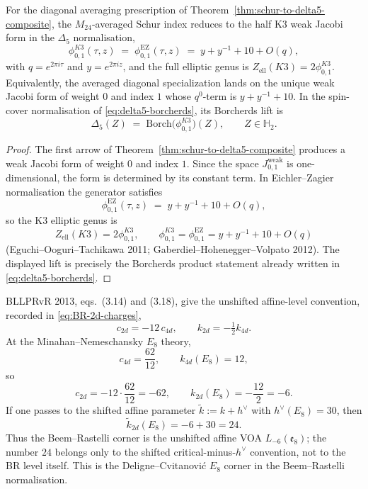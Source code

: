 \begin{proposition}
\label{prop:k3-m24-averaged-reduction}
For the diagonal averaging prescription of
Theorem~\ref{thm:schur-to-delta5-composite}, the $M_{24}$-averaged Schur index
reduces to the half K3 weak Jacobi form in the $\Delta_5$ normalisation,
\[
 \phi_{0,1}^{K3}(\tau,z)
 \;=\;
 \phi_{0,1}^{\mathrm{EZ}}(\tau,z)
 \;=\;
 y+y^{-1}+10+O(q),
\]
with $q=e^{2\pi i\tau}$ and $y=e^{2\pi i z}$, and the full elliptic genus is
$Z_{\mathrm{ell}}(K3)=2\phi_{0,1}^{K3}$. Equivalently, the averaged diagonal
specialization lands on the unique weak Jacobi form of weight $0$ and index
$1$ whose $q^0$-term is $y+y^{-1}+10$. In the spin-cover normalisation of
\eqref{eq:delta5-borcherds}, its Borcherds lift is
\[
 \Delta_5(Z)
 \;=\;
 \mathrm{Borch}\bigl(\phi_{0,1}^{K3}\bigr)(Z),
 \qquad
 Z\in \mathbb{H}_2.
\]
\end{proposition}

\begin{proof}
The first arrow of Theorem~\ref{thm:schur-to-delta5-composite} produces a weak
Jacobi form of weight $0$ and index $1$. Since the space
$J^{\mathrm{weak}}_{0,1}$ is one-dimensional, the form is determined by its
constant term. In Eichler--Zagier normalisation the generator satisfies
\[
 \phi_{0,1}^{\mathrm{EZ}}(\tau,z)
 \;=\;
 y+y^{-1}+10+O(q),
\]
so the K3 elliptic genus is
\[
Z_{\mathrm{ell}}(K3)=2\phi_{0,1}^{K3},\qquad
\phi_{0,1}^{K3}=\phi_{0,1}^{\mathrm{EZ}}
=y+y^{-1}+10+O(q)
\]
(Eguchi--Ooguri--Tachikawa 2011; Gaberdiel--Hohenegger--Volpato 2012). The
displayed lift is precisely the Borcherds product statement already written
in \eqref{eq:delta5-borcherds}.
\end{proof}

\begin{remark}
\label{rem:k3-BR-factor-verify}
BLLPRvR 2013, eqs.~(3.14) and (3.18), give the unshifted affine-level
convention, recorded in \eqref{eq:BR-2d-charges},
\[
 c_{2d} = -12\,c_{4d},
 \qquad
 k_{2d} = -\tfrac{1}{2}k_{4d}.
\]
At the Minahan--Nemeschansky $E_8$ theory,
\[
 c_{4d} = \frac{62}{12},
 \qquad
 k_{4d}(E_8) = 12,
\]
so
\[
 c_{2d} = -12\cdot \frac{62}{12} = -62,
 \qquad
 k_{2d}(E_8) = -\frac{12}{2} = -6.
\]
If one passes to the shifted affine parameter
$\widetilde{k} := k + h^\vee$ with $h^\vee(E_8)=30$, then
\[
 \widetilde{k}_{2d}(E_8) = -6 + 30 = 24.
\]
Thus the Beem--Rastelli corner is the unshifted affine VOA
$L_{-6}(\mathfrak{e}_8)$; the number $24$ belongs only to the shifted
critical-minus-$h^\vee$ convention, not to the BR level itself. This is the
Deligne--Cvitanovi\'c $E_8$ corner in the Beem--Rastelli normalisation.
\end{remark}


